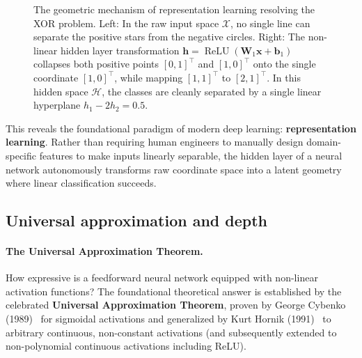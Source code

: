 \begin{figure}[H]
\begin{minipage}{0.48\linewidth}
\end{minipage}
\caption{The geometric mechanism of representation learning resolving the XOR problem. Left: In the raw input space $\mathcal{X}$, no single line can separate the positive stars from the negative circles. Right: The non-linear hidden layer transformation $\mathbf{h} = \operatorname{ReLU}(\mathbf{W}_1 \mathbf{x} + \mathbf{b}_1)$ collapses both positive points $[0, 1]^\top$ and $[1, 0]^\top$ onto the single coordinate $[1, 0]^\top$, while mapping $[1, 1]^\top$ to $[2, 1]^\top$. In this hidden space $\mathcal{H}$, the classes are cleanly separated by a single linear hyperplane $h_1 - 2h_2 = 0.5$.}
\label{fig:xor_representation_warping}
\end{figure}

This reveals the foundational paradigm of modern deep learning: \textbf{representation learning}. Rather than requiring human engineers to manually design domain-specific features to make inputs linearly separable, the hidden layer of a neural network autonomously transforms raw coordinate space into a latent geometry where linear classification succeeds.

\subsection{Universal approximation and depth}
\label{sec:universal_approximation_theorem}
\label{sec:perceptron_to_fcn}
\label{sec:activation_functions_foundations}

\paragraph{The Universal Approximation Theorem.}
How expressive is a feedforward neural network equipped with non-linear activation functions? The foundational theoretical answer is established by the celebrated \textbf{Universal Approximation Theorem}, proven by George Cybenko (1989)~\cite{cybenko1989approximation} for sigmoidal activations and generalized by Kurt Hornik (1991)~\cite{hornik1991approximation} to arbitrary continuous, non-constant activations (and subsequently extended to non-polynomial continuous activations including ReLU).

